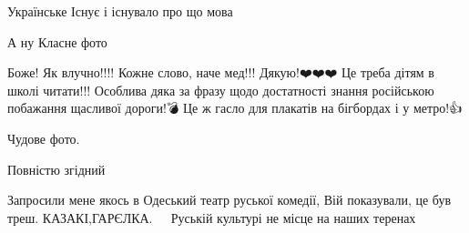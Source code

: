 \begin{itemize}
 
Українське Існує і існувало про що мова

 
А ну Класне фото

 

Боже! Як влучно!!!! Кожне слово, наче мед!!! Дякую!❤️❤️❤️ Це треба дітям в школі
читати!!! Особлива дяка за фразу щодо достатності знання російською побажання
щасливої дороги!💣 Це ж гасло для плакатів на бігбордах і у метро!👍


 
Чудове фото.

 
Повністю згідний

 

Запросили мене якось в Одеський театр руської комедії, Вій показували, це був
треш.  КАЗАКІ,ГАРЄЛКА.🤢🤢🤢🤢 Руській культурі не місце на наших теренах

\begin{itemize}
 

\end{itemize}
\end{itemize}
